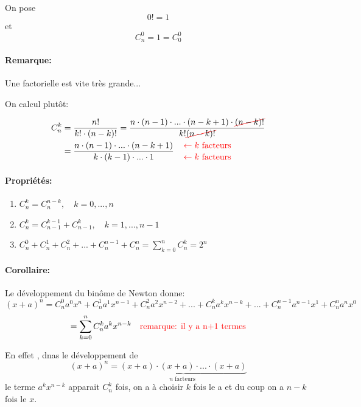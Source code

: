 \documentclass[
    11pt,
    a4paper,
    oneside,
    headinlcude, footinclude,
    twoside,
]{report}
\begin{document}
On pose  $$0! = 1$$ et $$C^{0}_{n} = 1 = C^{0}_{0}$$


\paragraph{Remarque:}
Une factorielle est vite très grande...

On calcul plutôt: 

\[
    \begin{split}
        C^{k}_{n} &= \frac{n!}{k! \cdot (n-k)!} = \frac{n \cdot (n-1) \cdot ... \cdot
        (n-k+1) \cdot {\color{red}\cancel{{\color{black} (n-k)!}}}}{k! {\color{red}\cancel{{\color{black} (n-k)!}}}}\\
        & = \frac{n \cdot (n-1) \cdot ... \cdot (n-k+1)}{k \cdot (k-1) \cdot ... \cdot 1}
        {\color{white} \quad \frac{{\color{red} \leftarrow k\text{ facteurs}}}{{\color{red} \leftarrow k\text{ facteurs}}}}
    \end{split}
\]

\paragraph{Propriétés:}

\begin{enumerate}
    \item $C^{k}_{n} = C^{n-k}_{n}, \quad k = 0, ..., n$
    \item $C^{k}_{n} = C^{k-1}_{n-1} + C^{k}_{n-1}, \quad k = 1, ..., n-1$
    \item $C^{0}_{n} + C^{1}_{n} + C^{2}_{n} +...+ C^{n-1}_{n} + C^{n}_{n} =
        \sum^{n}_{k=0} C^{k}_{n} = 2^{n} $

\end{enumerate}
\paragraph{Corollaire:}
    
Le développement du binôme de Newton donne:
$$(x+a)^{n} = C^{0}_{n} a^{0} x^{n} + C^{1}_{n} a^{1} x^{n-1} + C^{2}_{n} a^{2} x^{n-2}+ ...+ C^{k}_{n} a^{k} x^{n-k} +...+ C^{n-1}_{n} a^{n-1} x^{1} + C^{n}_{n} a^{n} x^{0} $$
$$= \sum^{n}_{k=0} C^{k}_{n} a^{k}x^{n-k} \quad \text{{\color{red}
remarque: il y a n+1 termes}}$$

En effet , dnas le développement de $$(x+a)^{n} = \underbrace{(x+a) \cdot (x+a) \cdot ...\cdot (x+a)}_{n \text{ facteurs } }$$
le terme $a^{k}x^{n-k}$ apparait $C^{k}_{n}$ fois, on a à choisir $k$ fois le a
et du coup on a $n-k$ fois le $x$.
\end{document}

